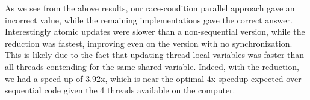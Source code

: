 \documentclass[titlepage]{article}
\begin{document}
As we see from the above results, our race-condition parallel
approach gave an incorrect value, while the remaining
implementations gave the correct answer. Interestingly
atomic updates were slower than a non-sequential version,
while the reduction was fastest, improving even on the version
with no synchronization. This is likely due to the fact that updating
thread-local variables was faster than all threads contending for
the same shared variable. Indeed, with the reduction, we had a
speed-up of 3.92x, which is near the optimal 4x speedup expected over
sequential code given the 4 threads available on the computer.
\end{document}
